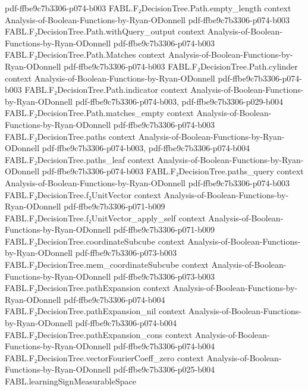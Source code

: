 \begin{theorem}
  {pdf-ffbe9c7b3306-p074-b003}
\proofstep
  {FABL.F₂DecisionTree.Path.empty_length}
  {context}
  {Analysis-of-Boolean-Functions-by-Ryan-ODonnell}
  {pdf-ffbe9c7b3306-p074-b003}
\proofstep
  {FABL.F₂DecisionTree.Path.withQuery_output}
  {context}
  {Analysis-of-Boolean-Functions-by-Ryan-ODonnell}
  {pdf-ffbe9c7b3306-p074-b003}
\proofstep
  {FABL.F₂DecisionTree.Path.Matches}
  {context}
  {Analysis-of-Boolean-Functions-by-Ryan-ODonnell}
  {pdf-ffbe9c7b3306-p074-b003}
\proofstep
  {FABL.F₂DecisionTree.Path.cylinder}
  {context}
  {Analysis-of-Boolean-Functions-by-Ryan-ODonnell}
  {pdf-ffbe9c7b3306-p074-b003}
\proofstep
  {FABL.F₂DecisionTree.Path.indicator}
  {context}
  {Analysis-of-Boolean-Functions-by-Ryan-ODonnell}
  {pdf-ffbe9c7b3306-p074-b003,
    pdf-ffbe9c7b3306-p029-b004}
\proofstep
  {FABL.F₂DecisionTree.Path.matches_empty}
  {context}
  {Analysis-of-Boolean-Functions-by-Ryan-ODonnell}
  {pdf-ffbe9c7b3306-p074-b003}
\proofstep
  {FABL.F₂DecisionTree.paths}
  {context}
  {Analysis-of-Boolean-Functions-by-Ryan-ODonnell}
  {pdf-ffbe9c7b3306-p074-b003,
    pdf-ffbe9c7b3306-p074-b004}
\proofstep
  {FABL.F₂DecisionTree.paths_leaf}
  {context}
  {Analysis-of-Boolean-Functions-by-Ryan-ODonnell}
  {pdf-ffbe9c7b3306-p074-b003}
\proofstep
  {FABL.F₂DecisionTree.paths_query}
  {context}
  {Analysis-of-Boolean-Functions-by-Ryan-ODonnell}
  {pdf-ffbe9c7b3306-p074-b003}
\proofstep
  {FABL.F₂DecisionTree.f₂UnitVector}
  {context}
  {Analysis-of-Boolean-Functions-by-Ryan-ODonnell}
  {pdf-ffbe9c7b3306-p071-b009}
\proofstep
  {FABL.F₂DecisionTree.f₂UnitVector_apply_self}
  {context}
  {Analysis-of-Boolean-Functions-by-Ryan-ODonnell}
  {pdf-ffbe9c7b3306-p071-b009}
\proofstep
  {FABL.F₂DecisionTree.coordinateSubcube}
  {context}
  {Analysis-of-Boolean-Functions-by-Ryan-ODonnell}
  {pdf-ffbe9c7b3306-p073-b003}
\proofstep
  {FABL.F₂DecisionTree.mem_coordinateSubcube}
  {context}
  {Analysis-of-Boolean-Functions-by-Ryan-ODonnell}
  {pdf-ffbe9c7b3306-p073-b003}
\proofstep
  {FABL.F₂DecisionTree.pathExpansion}
  {context}
  {Analysis-of-Boolean-Functions-by-Ryan-ODonnell}
  {pdf-ffbe9c7b3306-p074-b004}
\proofstep
  {FABL.F₂DecisionTree.pathExpansion_nil}
  {context}
  {Analysis-of-Boolean-Functions-by-Ryan-ODonnell}
  {pdf-ffbe9c7b3306-p074-b004}
\proofstep
  {FABL.F₂DecisionTree.pathExpansion_cons}
  {context}
  {Analysis-of-Boolean-Functions-by-Ryan-ODonnell}
  {pdf-ffbe9c7b3306-p074-b004}
\proofstep
  {FABL.F₂DecisionTree.vectorFourierCoeff_zero}
  {context}
  {Analysis-of-Boolean-Functions-by-Ryan-ODonnell}
  {pdf-ffbe9c7b3306-p025-b004}
\proofstep
  {FABL.learningSignMeasurableSpace}

\end{theorem}
